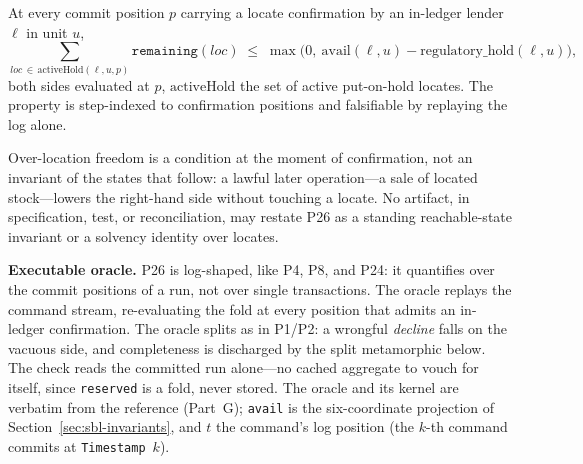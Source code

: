 \begin{invariant}
\label{inv:P26}
At every commit position $p$ carrying a locate confirmation by an in-ledger lender $\ell$ in unit $u$,
\[
\sum_{\mathit{loc}\,\in\,\mathrm{activeHold}(\ell,u,p)} \texttt{remaining}(\mathit{loc}) \;\leq\; \max\bigl(0,\ \mathrm{avail}(\ell,u) - \mathrm{regulatory\_hold}(\ell,u)\bigr),
\]
both sides evaluated at $p$, $\mathrm{activeHold}$ the set of active put-on-hold locates. The property is step-indexed to confirmation positions and falsifiable by replaying the log alone.
\end{invariant}

Over-location freedom is a condition at the moment of confirmation, not an invariant of the states that follow: a lawful later operation---a sale of located stock---lowers the right-hand side without touching a locate. No artifact, in specification, test, or reconciliation, may restate P26 as a standing reachable-state invariant or a solvency identity over locates.

\noindent\textbf{Executable oracle.} P26 is log-shaped, like P4, P8, and P24: it quantifies over the commit positions of a run, not over single transactions. The oracle replays the command stream, re-evaluating the fold at every position that admits an in-ledger confirmation. The oracle splits as in P1/P2: a wrongful \emph{decline} falls on the vacuous side, and completeness is discharged by the split metamorphic below. The check reads the committed run alone---no cached aggregate to vouch for itself, since \texttt{reserved} is a fold, never stored. The oracle and its kernel are verbatim from the reference (Part~G); \texttt{avail} is the six-coordinate projection of Section~\ref{sec:sbl-invariants}, and $t$ the command's log position (the $k$-th command commits at \texttt{Timestamp}~$k$).

